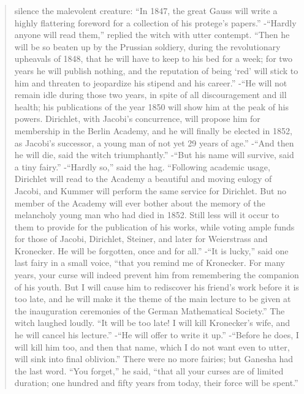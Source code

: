 \documentclass[b5paper]{article}
\begin{document}
\begin{mdframed}
\begin{quotation}
silence the malevolent creature: \enquote{In 1847, the great Gauss will write a highly flattering foreword for a collection of his protege's papers.} -\enquote{Hardly anyone will read them,} replied the witch with utter contempt. \enquote{Then he will be so beaten up by the Prussian soldiery, during the revolutionary upheavals of 1848, that he will have to keep to his bed for a week; for two years he will publish nothing, and the reputation of being \enquote{red} will stick to him and threaten to jeopardize his stipend and his career.} -\enquote{He will not remain idle during those two years, in spite of all discouragement and ill health; his publications of the year 1850 will show him at the peak of his powers. Dirichlet, with Jacobi's concurrence, will propose him for membership in the Berlin Academy, and he will finally be elected in 1852, as Jacobi's successor, a young man of not yet 29 years of age.} -\enquote{And then he will die, said the witch triumphantly.} -\enquote{But his name will survive, said a tiny fairy.} -\enquote{Hardly so,} said the hag. \enquote{Following academic usage, Dirichlet will read to the Academy a beautiful and moving eulogy of Jacobi, and Kummer will perform the same service for Dirichlet. But no member of the Academy will ever bother about the memory of the melancholy young man who had died in 1852. Still less will it occur to them to provide for the publication of his works, while voting ample funds for those of Jacobi, Dirichlet, Steiner, and later for Weierstrass and Kronecker. He will be forgotten, once and for all.} -\enquote{It is lucky,} said one last fairy in a small voice, \enquote{that you remind me of Kronecker. For many years, your curse will indeed prevent him from remembering the companion of his youth. But I will cause him to rediscover his friend's work before it is too late, and he will make it the theme of the main lecture to be given at the inauguration ceremonies of the German Mathematical Society.} The witch laughed loudly. \enquote{It will be too late! I will kill Kronecker's wife, and he will cancel his lecture.} -\enquote{He will offer to write it up.} -\enquote{Before he does, I will kill him too, and then that name, which I do not want even to utter, will sink into final oblivion.} There were no more fairies; but Ganesha had the last word. \enquote{You forget,} he said, \enquote{that all your curses are of limited duration; one hundred and fifty years from today, their force will be spent.}
\end{quotation}
\end{mdframed}
\end{document}

